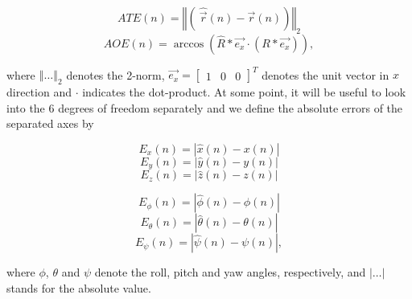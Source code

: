 \begin{equation}
       ATE \left( n \right) = \left\Vert\left(\ \hat{\vec{r}} \left( n \right) - \vec{r} \left( n \right) \right) \right\Vert_2
\end{equation}
\begin{equation}
       AOE \left( n \right) = \arccos \left( \hat{R} *\vec{e_{x}} \cdot\left( R *\vec{e_{x}} \right)\right) ,
\end{equation}

where $\left\Vert \dots \right\Vert_2$ denotes the 2-norm, $\vec{e_{x}} = \left[ \begin{array}{ccc} 1& 0& 0 \end{array} \right]^T$ denotes the unit vector in $x$ direction and $\cdot$ indicates the dot-product. At some point, it will be useful to look into the 6 degrees of freedom separately and we define the absolute errors of the separated axes by

\begin{equation}
       E_{x} \left( n \right) = \left| \hat{x} \left( n \right) - x \left( n \right) \right| 
\end{equation}
\begin{equation}
       E_{y} \left( n \right) = \left| \hat{y} \left( n \right) - y \left( n \right) \right|
\end{equation}
\begin{equation}
       E_{z} \left( n \right) = \left| \hat{z} \left( n \right) - z \left( n \right) \right|
\end{equation}

\begin{equation}
	E_{\phi} \left( n \right) = \left| \hat{\phi} \left( n \right) - \phi \left( n \right)\right|
\end{equation}
\begin{equation}
	E_{\theta} \left( n \right) = \left| \hat{\theta} \left( n \right) - \theta \left( n \right)\right|
\end{equation}
\begin{equation}
	E_{\psi} \left( n \right) = \left| \hat{\psi} \left( n \right) - \psi \left( n \right)\right| ,
\end{equation}

where $\phi$, $\theta$ and $\psi$ denote the roll, pitch and yaw angles, respectively, and $\left| \dots \right|$ stands for the absolute value.



